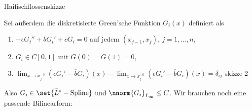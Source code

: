 Haifischflossenskizze

Sei außerdem die diskretisierte Green'sche Funktion $G_{i}(x)$ definiert als
\begin{enumerate}
\item $- \epsilon G_{i}'' + \bar b G_{i}' + \bar c G_{i} = 0$ auf jedem $(x_{j-1}, x_{j})$, $j = 1, \dots, n$, 
\item $G_{i} \in C[0, 1]$ mit $G(0) = G(1) = 0$, 
\item \label{num:iii} $\lim_{x \to x_{j}^{-0}} (\epsilon G_{i}' - \bar b G_{i})(x) - \lim_{x \to x_{j}^{+0}} (\epsilon G_{i}' - \bar b G_{i})(x) = \delta_{ij}$
  skizze 2  
\end{enumerate}
Also $G_{i} \in \set{\bar L^{*} - \text{Spline}}$ und $\nnorm {G_{i}}_{L_{\infty}}\leq C$. Wir brauchen noch eine passende Bilinearform: 

